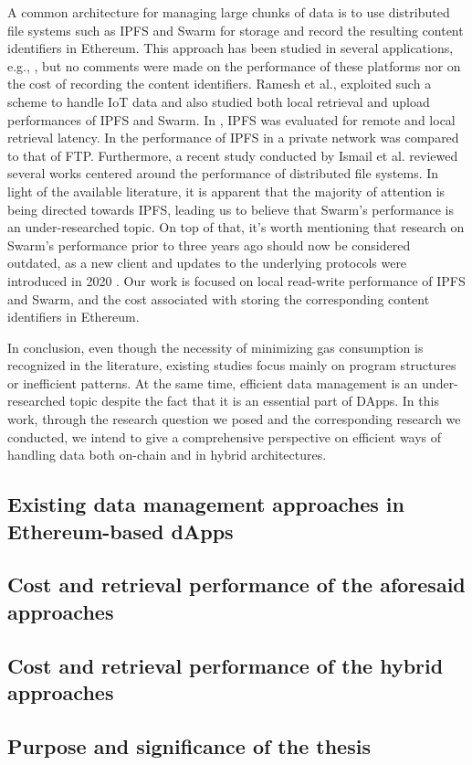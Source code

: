 A common architecture for managing large chunks of data is to use distributed file systems such as IPFS and Swarm for storage and record the resulting content identifiers in Ethereum. This approach has been studied in several applications, e.g., \citep{hao_j_2018, ren_2021}, but no comments were made on the performance of these platforms nor on the cost of recording the content identifiers. Ramesh et al.\cite{ramesh_2019}, exploited such a scheme to handle IoT data and also studied both local retrieval and upload performances of IPFS and Swarm. In \citep{shen_2019}, IPFS was evaluated for remote and local retrieval latency. In \citep{abdullah_2021} the performance of IPFS in a private network was compared to that of FTP. Furthermore, a recent study conducted by Ismail et al. \cite{aisyah_2022} reviewed several works centered around the performance of distributed file systems. In light of the available literature, it is apparent that the majority of attention is being directed towards IPFS, leading us to believe that Swarm’s performance is an under-researched topic. On top of that, it's worth mentioning that research on Swarm's performance prior to three years ago should now be considered outdated, as a new client \citep{swarm_bee} and updates to the underlying protocols were introduced in 2020 \citep{tron_2020}. Our work is focused on local read-write performance of IPFS and Swarm, and the cost associated with storing the corresponding content identifiers in Ethereum.

In conclusion, even though the necessity of minimizing gas consumption is recognized in the literature, existing studies focus mainly on program structures or inefficient patterns. At the same time, efficient data management is an under-researched topic despite the fact that it is an essential part of DApps. In this work, through the research question we posed and the corresponding research we conducted, we intend to give a comprehensive perspective on efficient ways of handling data both on-chain and in hybrid architectures.

\subsection{Existing data management approaches in Ethereum-based dApps}\label{subsection:}
\subsection{Cost and retrieval performance of the aforesaid approaches}\label{subsection:}
\subsection{Cost and retrieval performance of the hybrid approaches}\label{subsection:}
\subsection{Purpose and significance of the thesis}\label{subsection:}

